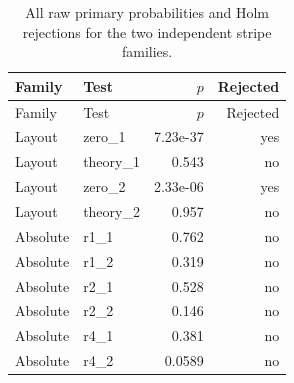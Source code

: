 {\small\setlength{\tabcolsep}{3.5pt}
\begin{longtable}{llrr}
\caption{All raw primary probabilities and Holm rejections for the two independent stripe families.}\\
\toprule
Family & Test & $p$ & Rejected\\
\midrule
\endfirsthead
\toprule
Family & Test & $p$ & Rejected\\
\midrule
\endhead
\bottomrule\endfoot
Layout & zero\_1 & 7.23e-37 & yes\\
Layout & theory\_1 & 0.543 & no\\
Layout & zero\_2 & 2.33e-06 & yes\\
Layout & theory\_2 & 0.957 & no\\
Absolute & r1\_1 & 0.762 & no\\
Absolute & r1\_2 & 0.319 & no\\
Absolute & r2\_1 & 0.528 & no\\
Absolute & r2\_2 & 0.146 & no\\
Absolute & r4\_1 & 0.381 & no\\
Absolute & r4\_2 & 0.0589 & no\\
\end{longtable}}
